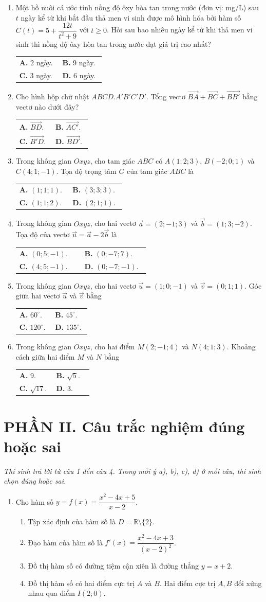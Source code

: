 \documentclass[12pt,a4paper]{article}
\makeatletter
\newcommand{\bonpa}[4]{\par\nobreak\smallskip\nobreak\noindent
\begin{tabular}{@{}p{0.47\linewidth}p{0.47\linewidth}@{}}
\textbf{A.} #1 & \textbf{B.} #2\\[8pt]
\textbf{C.} #3 & \textbf{D.} #4\end{tabular}}
\makeatother
\begin{document}
\newpage
\begin{enumerate}[start=7]
\item Một hồ nuôi cá ước tính nồng độ ôxy hòa tan trong nước (đơn vị: mg/L) sau $t$ ngày kể từ khi bắt đầu thả men vi sinh được mô hình hóa bởi hàm số $C(t)=5+\dfrac{12t}{t^2+9}$ với $t\ge 0$. Hỏi sau bao nhiêu ngày kể từ khi thả men vi sinh thì nồng độ ôxy hòa tan trong nước đạt giá trị cao nhất?
\bonpa{$2$ ngày.}{$9$ ngày.}{$3$ ngày.}{$6$ ngày.}

\item Cho hình hộp chữ nhật $ABCD.A'B'C'D'$. Tổng vectơ $\vec{BA}+\vec{BC}+\vec{BB'}$ bằng vectơ nào dưới đây?
\bonpa{$\vec{BD}$.}{$\vec{AC'}$.}{$\vec{B'D}$.}{$\vec{BD'}$.}

\item Trong không gian $Oxyz$, cho tam giác $ABC$ có $A(1;2;3)$, $B(-2;0;1)$ và $C(4;1;-1)$. Tọa độ trọng tâm $G$ của tam giác $ABC$ là
\bonpa{$(1;1;1)$.}{$(3;3;3)$.}{$(1;1;2)$.}{$(2;1;1)$.}

\item Trong không gian $Oxyz$, cho hai vectơ $\vec{a}=(2;-1;3)$ và $\vec{b}=(1;3;-2)$. Tọa độ của vectơ $\vec{u}=\vec{a}-2\vec{b}$ là
\bonpa{$(0;5;-1)$.}{$(0;-7;7)$.}{$(4;5;-1)$.}{$(0;-7;-1)$.}

\item Trong không gian $Oxyz$, cho hai vectơ $\vec{u}=(1;0;-1)$ và $\vec{v}=(0;1;1)$. Góc giữa hai vectơ $\vec{u}$ và $\vec{v}$ bằng
\bonpa{$60^\circ$.}{$45^\circ$.}{$120^\circ$.}{$135^\circ$.}

\item Trong không gian $Oxyz$, cho hai điểm $M(2;-1;4)$ và $N(4;1;3)$. Khoảng cách giữa hai điểm $M$ và $N$ bằng
\bonpa{$9$.}{$\sqrt{5}$.}{$\sqrt{17}$.}{$3$.}
\end{enumerate}

\vspace{3pt}
\section*{\large PHẦN II. Câu trắc nghiệm đúng hoặc sai}
\textit{Thí sinh trả lời từ câu 1 đến câu 4. Trong mỗi ý a), b), c), d) ở mỗi câu, thí sinh chọn đúng hoặc sai.}
\begin{enumerate}
\item Cho hàm số $y=f(x)=\dfrac{x^2-4x+5}{x-2}$.
\begin{enumerate}
\item Tập xác định của hàm số là $D=\mathbb{R}\setminus\{2\}$.
\item Đạo hàm của hàm số là $f'(x)=\dfrac{x^2-4x+3}{(x-2)^2}$.
\item Đồ thị hàm số có đường tiệm cận xiên là đường thẳng $y=x+2$.
\item Đồ thị hàm số có hai điểm cực trị $A$ và $B$. Hai điểm cực trị $A, B$ đối xứng nhau qua điểm $I(2;0)$.
\end{enumerate}
\end{enumerate}
\end{document}
